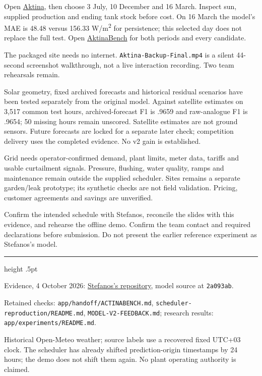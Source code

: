 \documentclass[10pt,a4paper]{article}
\newcommand{\smallhead}[1]{\vspace{3mm}{\large\bfseries #1}\par}
\begin{document}
\smallhead{Demo and backup}
Open \href{https://aktina-pafos-2026.vercel.app}{Aktina}, then choose 3 July, 10 December and 16 March. Inspect sun, supplied production and ending tank stock before cost. On 16 March the model's MAE is 48.48 versus 156.33 W/m\textsuperscript{2} for persistence; this selected day does not replace the full test. Open \href{https://aktina-pafos-2026.vercel.app/benchmark.html}{AktinaBench} for both periods and every candidate.

The packaged site needs no internet. \texttt{Aktina-Backup-Final.mp4} is a silent 44-second screenshot walkthrough, not a live interaction recording. Two team rehearsals remain.

\smallhead{Next model evidence}
Solar geometry, fixed archived forecasts and historical residual scenarios have been tested separately from the original model. Against satellite estimates on 3,517 common test hours, archived-forecast F1 is .9659 and raw-analogue F1 is .9654; 50 missing hours remain unscored. Satellite estimates are not ground sensors. Future forecasts are locked for a separate later check; competition delivery uses the completed evidence. No v2 gain is established.

\smallhead{Pilot and business scope}
Grid needs operator-confirmed demand, plant limits, meter data, tariffs and usable curtailment signals. Pressure, flushing, water quality, ramps and maintenance remain outside the supplied scheduler. Sites remains a separate garden/leak prototype; its synthetic checks are not field validation. Pricing, customer agreements and savings are unverified.

\smallhead{Submission checks}
Confirm the intended schedule with Stefanos, reconcile the slides with this evidence, and rehearse the offline demo. Confirm the team contact and required declarations before submission. Do not present the earlier reference experiment as Stefanos's model.

\vfill
\hrule height .5pt\vspace{3mm}
{\footnotesize Evidence, 4 October 2026: \href{https://github.com/stefanosbordea/actina/tree/stefanos-model}{Stefanos's repository}, model source at \texttt{2a093ab}.\par
Retained checks: \texttt{app/handoff/ACTINABENCH.md}, \texttt{scheduler-reproduction/README.md}, \texttt{MODEL-V2-FEEDBACK.md}; research results: \texttt{app/experiments/README.md}.\par
Historical Open-Meteo weather; source labels use a recovered fixed UTC+03 clock. The scheduler has already shifted prediction-origin timestamps by 24 hours; the demo does not shift them again. No plant operating authority is claimed.}
\end{document}
